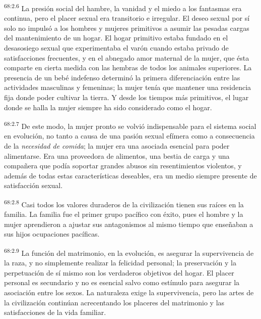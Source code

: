 \documentclass[twoside, 11pt]{book}
\begin{document}
\par
\textsuperscript{68:2.6} La presión social del hambre, la vanidad y el miedo a los fantasmas era continua, pero el placer sexual era transitorio e irregular. El deseo sexual por sí solo no impulsó a los hombres y mujeres primitivos a asumir las pesadas cargas del mantenimiento de un hogar. El hogar primitivo estaba fundado en el desasosiego sexual que experimentaba el varón cuando estaba privado de satisfacciones frecuentes, y en el abnegado amor maternal de la mujer, que ésta comparte en cierta medida con las hembras de todos los animales superiores. La presencia de un bebé indefenso determinó la primera diferenciación entre las actividades masculinas y femeninas; la mujer tenía que mantener una residencia fija donde poder cultivar la tierra. Y desde los tiempos más primitivos, el lugar donde se halla la mujer siempre ha sido considerado como el hogar.

\par
\textsuperscript{68:2.7} De este modo, la mujer pronto se volvió indispensable para el sistema social en evolución, no tanto a causa de una pasión sexual efímera como a consecuencia de la \textit{necesidad de comida}; la mujer era una asociada esencial para poder alimentarse. Era una proveedora de alimentos, una bestia de carga y una compañera que podía soportar grandes abusos sin resentimientos violentos, y además de todas estas características deseables, era un medio siempre presente de satisfacción sexual.

\par
\textsuperscript{68:2.8} Casi todos los valores duraderos de la civilización tienen sus raíces en la familia. La familia fue el primer grupo pacífico con éxito, pues el hombre y la mujer aprendieron a ajustar sus antagonismos al mismo tiempo que enseñaban a sus hijos ocupaciones pacíficas.

\par
\textsuperscript{68:2.9} La función del matrimonio, en la evolución, es asegurar la supervivencia de la raza, y no simplemente realizar la felicidad personal; la preservación y la perpetuación de sí mismo son los verdaderos objetivos del hogar. El placer personal es secundario y no es esencial salvo como estímulo para asegurar la asociación entre los sexos. La naturaleza exige la supervivencia, pero las artes de la civilización continúan acrecentando los placeres del matrimonio y las satisfacciones de la vida familiar.
\end{document}
